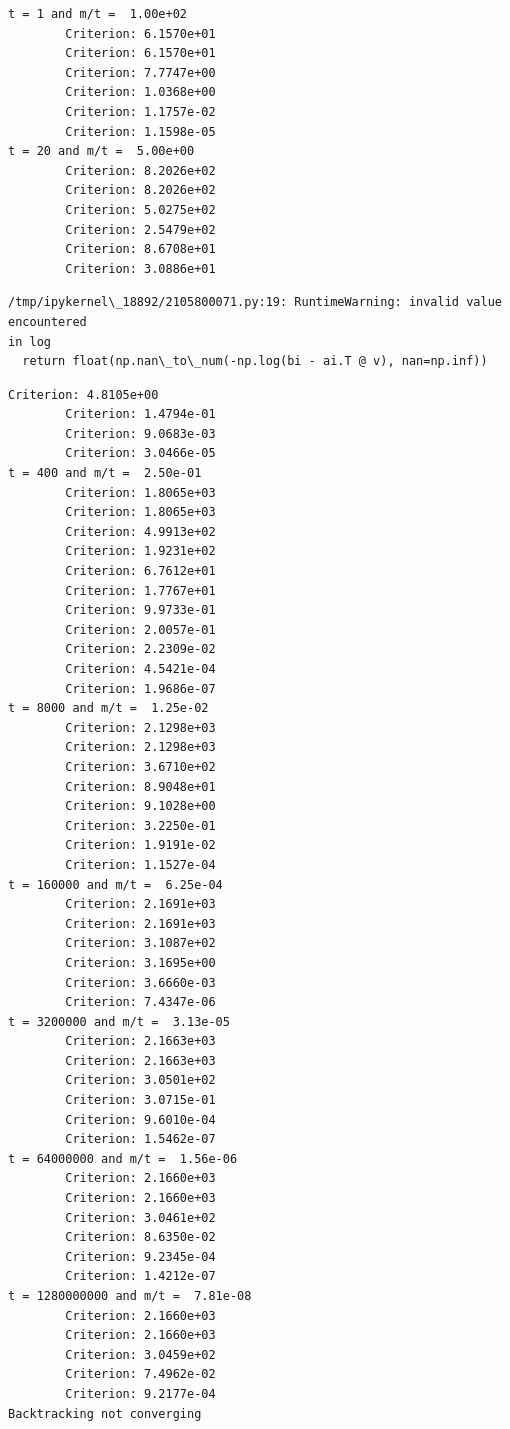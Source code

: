 \documentclass[11pt]{article}
\begin{document}
    \begin{Verbatim}[commandchars=\\\{\}]
t = 1 and m/t =  1.00e+02
        Criterion: 6.1570e+01
        Criterion: 6.1570e+01
        Criterion: 7.7747e+00
        Criterion: 1.0368e+00
        Criterion: 1.1757e-02
        Criterion: 1.1598e-05
t = 20 and m/t =  5.00e+00
        Criterion: 8.2026e+02
        Criterion: 8.2026e+02
        Criterion: 5.0275e+02
        Criterion: 2.5479e+02
        Criterion: 8.6708e+01
        Criterion: 3.0886e+01
    \end{Verbatim}

    \begin{Verbatim}[commandchars=\\\{\}]
/tmp/ipykernel\_18892/2105800071.py:19: RuntimeWarning: invalid value encountered
in log
  return float(np.nan\_to\_num(-np.log(bi - ai.T @ v), nan=np.inf))
    \end{Verbatim}

    \begin{Verbatim}[commandchars=\\\{\}]
        Criterion: 4.8105e+00
        Criterion: 1.4794e-01
        Criterion: 9.0683e-03
        Criterion: 3.0466e-05
t = 400 and m/t =  2.50e-01
        Criterion: 1.8065e+03
        Criterion: 1.8065e+03
        Criterion: 4.9913e+02
        Criterion: 1.9231e+02
        Criterion: 6.7612e+01
        Criterion: 1.7767e+01
        Criterion: 9.9733e-01
        Criterion: 2.0057e-01
        Criterion: 2.2309e-02
        Criterion: 4.5421e-04
        Criterion: 1.9686e-07
t = 8000 and m/t =  1.25e-02
        Criterion: 2.1298e+03
        Criterion: 2.1298e+03
        Criterion: 3.6710e+02
        Criterion: 8.9048e+01
        Criterion: 9.1028e+00
        Criterion: 3.2250e-01
        Criterion: 1.9191e-02
        Criterion: 1.1527e-04
t = 160000 and m/t =  6.25e-04
        Criterion: 2.1691e+03
        Criterion: 2.1691e+03
        Criterion: 3.1087e+02
        Criterion: 3.1695e+00
        Criterion: 3.6660e-03
        Criterion: 7.4347e-06
t = 3200000 and m/t =  3.13e-05
        Criterion: 2.1663e+03
        Criterion: 2.1663e+03
        Criterion: 3.0501e+02
        Criterion: 3.0715e-01
        Criterion: 9.6010e-04
        Criterion: 1.5462e-07
t = 64000000 and m/t =  1.56e-06
        Criterion: 2.1660e+03
        Criterion: 2.1660e+03
        Criterion: 3.0461e+02
        Criterion: 8.6350e-02
        Criterion: 9.2345e-04
        Criterion: 1.4212e-07
t = 1280000000 and m/t =  7.81e-08
        Criterion: 2.1660e+03
        Criterion: 2.1660e+03
        Criterion: 3.0459e+02
        Criterion: 7.4962e-02
        Criterion: 9.2177e-04
Backtracking not converging
    \end{Verbatim}
\end{document}
